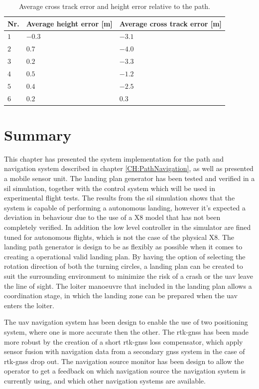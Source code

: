 \begin{table}[H]
\centering
\begin{tabular}{| l | l | l |}
\hline
\textbf{Nr.} 	& \textbf{Average height error [m]} 	& \textbf{Average cross track error [m]}  \\ \hline
$1$				& $-0.3$							& $-3.1$								\\ \hline
$2$				& $0.7$							& $-4.0$								\\ \hline
$3$				& $0.2$							& $-3.3$								\\ \hline
$4$				& $0.5$							& $-1.2$								\\ \hline
$5$				& $0.4$							& $-2.5$								\\ \hline
$6$				& $0.2$							& $0.3$								\\ \hline
\end{tabular}
\caption{Average cross track error and height error relative to the path.}
\label{Tb:SILAverageCrossHeight}
\end{table}
\section{Summary}
This chapter has presented the system implementation for the path and navigation system described in chapter \ref{CH:PathNavigation}, as well as presented a mobile sensor unit. The landing plan generator has been tested and verified in a \gls{sil} simulation, together with the control system which will be used in experimental flight tests. The results from the \gls{sil} simulation shows that the system is capable of performing a autonomous landing, however it's expected a deviation in behaviour due to the use of a X8 model that has not been completely verified. In addition the low level controller in the simulator are fined tuned for autonomous flights, which is not the case of the physical X8. The landing path generator is design to be as flexibly as possible when it comes to creating a operational valid landing plan. By having the option of selecting the rotation direction of both the turning circles, a landing plan can be created to suit the surrounding environment to minimize the risk of a crash or the \gls{uav} leave the line of sight. The loiter manoeuvre that included in the landing plan allows a coordination stage, in which the landing zone can be prepared when the \gls{uav} enters the loiter. 

The \gls{uav} navigation system has been design to enable the use of two positioning system, where one is more accurate then the other. The \gls{rtk-gnss} has been made more robust by the creation of a short \gls{rtk-gnss} loss compensator, which apply sensor fusion with navigation data from a secondary \gls{gnss} system in the case of \gls{rtk-gnss} drop out. The navigation source monitor has been design to allow the operator to get a feedback on which navigation source the navigation system is currently using, and which other navigation systems are available.

